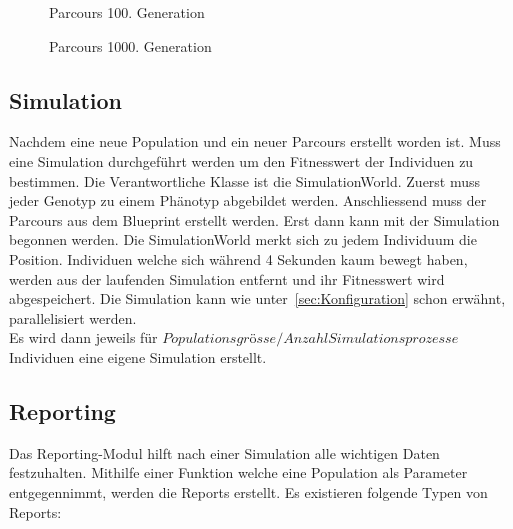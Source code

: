      \begin{figure}[H]
        \centering
        
        \caption{Parcours 100. Generation\label{fig:parcours2}}
      \end{figure}

      \begin{figure}[H]
        \centering
        
        \caption{Parcours 1000. Generation\label{fig:parcours3}}
      \end{figure}

      \subsection{Simulation\label{sec:simulation}}

        Nachdem eine neue Population und ein neuer Parcours erstellt worden ist.
        Muss eine Simulation durchgeführt werden um den Fitnesswert der Individuen zu bestimmen.
        Die Verantwortliche Klasse ist die SimulationWorld.
        Zuerst muss jeder Genotyp zu einem Phänotyp abgebildet werden.
        Anschliessend muss der Parcours aus dem Blueprint erstellt werden. %
        Erst dann kann mit der Simulation begonnen werden.
        Die SimulationWorld merkt sich zu jedem Individuum die Position.
        Individuen welche sich während 4 Sekunden kaum bewegt haben,
        werden aus der laufenden Simulation entfernt und ihr Fitnesswert wird abgespeichert.
        Die Simulation kann wie unter~\ref{sec:Konfiguration} schon erwähnt, parallelisiert werden. \\
        Es wird dann jeweils für \( Populationsgrösse / Anzahl Simulationsprozesse \) Individuen eine eigene Simulation erstellt.

    \subsection{Reporting\label{subsec:Reporting}}

      Das Reporting-Modul hilft nach einer Simulation alle wichtigen Daten festzuhalten.
      Mithilfe einer Funktion welche eine Population als Parameter entgegennimmt,
      werden die Reports erstellt.
      Es existieren folgende Typen von Reports:

